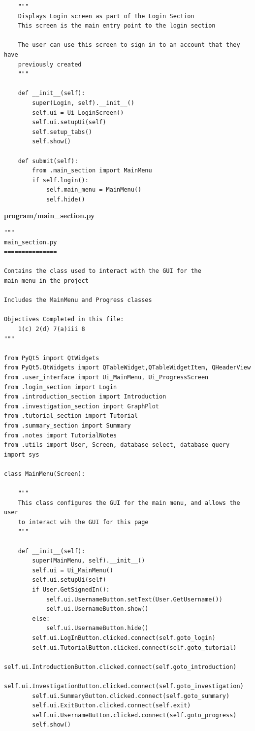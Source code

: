 \documentclass{article}
\begin{document}
\begin{lstlisting}
    """
    Displays Login screen as part of the Login Section
    This screen is the main entry point to the login section

    The user can use this screen to sign in to an account that they have
    previously created
    """

    def __init__(self):
        super(Login, self).__init__()
        self.ui = Ui_LoginScreen()
        self.ui.setupUi(self)
        self.setup_tabs()
        self.show()

    def submit(self):
        from .main_section import MainMenu
        if self.login():
            self.main_menu = MainMenu()
            self.hide()
\end{lstlisting}


\textbf{program/main\_section.py}
\begin{lstlisting}
"""
main_section.py
===============

Contains the class used to interact with the GUI for the
main menu in the project

Includes the MainMenu and Progress classes

Objectives Completed in this file:
    1(c) 2(d) 7(a)iii 8
"""

from PyQt5 import QtWidgets
from PyQt5.QtWidgets import QTableWidget,QTableWidgetItem, QHeaderView
from .user_interface import Ui_MainMenu, Ui_ProgressScreen
from .login_section import Login
from .introduction_section import Introduction
from .investigation_section import GraphPlot
from .tutorial_section import Tutorial
from .summary_section import Summary
from .notes import TutorialNotes
from .utils import User, Screen, database_select, database_query
import sys

class MainMenu(Screen):

    """
    This class configures the GUI for the main menu, and allows the user
    to interact wih the GUI for this page
    """

    def __init__(self):
        super(MainMenu, self).__init__()
        self.ui = Ui_MainMenu()
        self.ui.setupUi(self)
        if User.GetSignedIn():
            self.ui.UsernameButton.setText(User.GetUsername())
            self.ui.UsernameButton.show()
        else:
            self.ui.UsernameButton.hide()
        self.ui.LogInButton.clicked.connect(self.goto_login)
        self.ui.TutorialButton.clicked.connect(self.goto_tutorial)
        self.ui.IntroductionButton.clicked.connect(self.goto_introduction)
        self.ui.InvestigationButton.clicked.connect(self.goto_investigation)
        self.ui.SummaryButton.clicked.connect(self.goto_summary)
        self.ui.ExitButton.clicked.connect(self.exit)
        self.ui.UsernameButton.clicked.connect(self.goto_progress)
        self.show()


\end{lstlisting}
\end{document}
